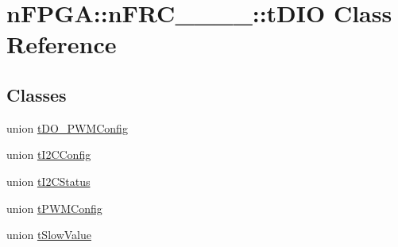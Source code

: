 \hypertarget{classnFPGA_1_1nFRC__2012__1__6__4_1_1tDIO}{
\section{nFPGA::nFRC\_\_\_\_::tDIO Class Reference}
\label{classnFPGA_1_1nFRC__2012__1__6__4_1_1tDIO}
}
\subsection*{Classes}
\begin{DoxyCompactItemize}
\item 
union \hyperlink{unionnFPGA_1_1nFRC__2012__1__6__4_1_1tDIO_1_1tDO__PWMConfig}{tDO\_\-PWMConfig}
\item 
union \hyperlink{unionnFPGA_1_1nFRC__2012__1__6__4_1_1tDIO_1_1tI2CConfig}{tI2CConfig}
\item 
union \hyperlink{unionnFPGA_1_1nFRC__2012__1__6__4_1_1tDIO_1_1tI2CStatus}{tI2CStatus}
\item 
union \hyperlink{unionnFPGA_1_1nFRC__2012__1__6__4_1_1tDIO_1_1tPWMConfig}{tPWMConfig}
\item 
union \hyperlink{unionnFPGA_1_1nFRC__2012__1__6__4_1_1tDIO_1_1tSlowValue}{tSlowValue}
\end{DoxyCompactItemize}
